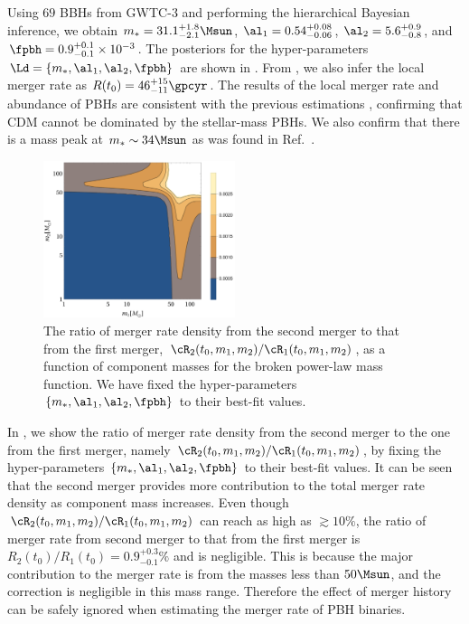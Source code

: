 \documentclass[
reprint,           %
superscriptaddress,%
amsmath,           %
amssymb,           %
aps,               %
prd,               %
notitlepage,       %
longbibliography,  %
floatfix,          %
nofootinbib,
]{revtex4-1}
\begin{document}
Using $69$ BBHs from GWTC-3 and performing the hierarchical Bayesian inference, we obtain $m_* = 31.1^{+1.8}_{-2.1} \Msun$, $\al_1 = 0.54^{+0.08}_{-0.06}$, $\al_2 = 5.6^{+0.9}_{-0.8}$, and $\fpbh = 0.9^{+0.1}_{-0.1} \times 10^{-3}$. The posteriors for the hyper-parameters $\Ld = \{m_*, \al_1, \al_2, \fpbh\}$ are shown in . From , we also infer the local merger rate as $R(t_0) = 46^{+15}_{-11} \gpcyr$. The results of the local merger rate and abundance of PBHs are consistent with the previous estimations \cite{Sasaki:2016jop,Ali-Haimoud:2017rtz,Chen:2018czv,Chen:2018rzo,Chen:2019irf,Wu:2020drm,Chen:2021nxo,Chen:2022fda,Zheng:2022wqo}, confirming that CDM cannot be dominated by the stellar-mass PBHs. We also confirm that there is a mass peak at $m_* \sim 34 \Msun$ as was found in  Ref.~\cite{Deng:2021ezy}.


\begin{figure}[tbp!]
	\centering
	\includegraphics[width=0.5\textwidth]{ratio-bpower.pdf}
	\caption{\label{ratio-bpower}The ratio of merger rate density from the second merger to that from the first merger, $\cR_2(t_0, m_1, m_2)/\cR_1(t_0, m_1, m_2)$, as a function of component masses for the broken power-law mass function. We have fixed the hyper-parameters $\{m_*, \al_1, \al_2, \fpbh\}$ to their best-fit values.}
\end{figure}

In , we show the ratio of merger rate density from the second merger to the one from the first merger, namely $\cR_2(t_0, m_1, m_2)/\cR_1(t_0, m_1, m_2)$, by fixing the hyper-parameters $\{m_*, \al_1, \al_2, \fpbh\}$ to their best-fit values. It can be seen that the second merger provides more contribution to the total merger rate density as component mass increases. Even though $\cR_2(t_0, m_1, m_2)/\cR_1(t_0, m_1, m_2)$ can reach as high as $\gtrsim 10\%$, the ratio of merger rate from second merger to that from the first merger is $R_2(t_0)/R_1(t_0) = 0.9^{+0.3}_{-0.1}\%$ and is negligible. This is because the major contribution to the merger rate is from the masses less than $50\Msun$, and the correction is negligible in this mass range. Therefore the effect of merger history can be safely ignored when estimating the merger rate of PBH binaries.
\end{document}
